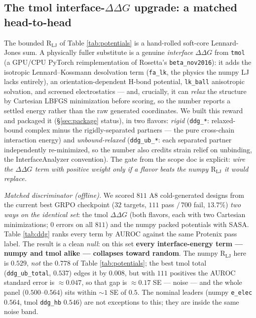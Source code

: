 \documentclass[11pt]{article}
\newcommand{\R}{\mathrm{R}}
\newcommand{\ttk}[1]{\texttt{\small #1}}
\begin{document}
\subsection{The tmol interface-\texorpdfstring{$\Delta\Delta G$}{ddG} upgrade: a matched head-to-head}
\label{sec:ddg}
The bounded $\R_{\mathrm{LJ}}$ of Table \ref{tab:potentials} is a hand-rolled soft-core Lennard-Jones
sum. A physically fuller substitute is a genuine \emph{interface} $\Delta\Delta G$ from
\ttk{tmol} (a GPU/CPU PyTorch reimplementation of Rosetta's \ttk{beta\_nov2016}): it adds the
isotropic Lennard--Kossmann desolvation term (\ttk{fa\_lk}, the physics the numpy LJ lacks entirely),
an orientation-dependent H-bond potential, \ttk{lk\_ball} anisotropic solvation, and screened
electrostatics --- and, crucially, it can \emph{relax} the structure by Cartesian LBFGS minimization
before scoring, so the number reports a settled energy rather than the raw generated coordinates. We
built this reward and packaged it (\S\ref{sec:package} status), in two flavors: \emph{rigid}
(\ttk{ddg\_*}: relaxed-bound complex minus the rigidly-separated partners --- the pure cross-chain
interaction energy) and \emph{unbound-relaxed} (\ttk{ddg\_ub\_*}: each separated partner
independently re-minimized, so the number also credits strain relief on unbinding, the
InterfaceAnalyzer convention). The gate from the scope doc is explicit: \emph{wire the $\Delta\Delta G$
term with positive weight only if a flavor beats the numpy $\R_{\mathrm{LJ}}$ it would replace.}

\emph{Matched discriminator (offline).} We scored $811$ A8 cold-generated designs from the current
best GRPO checkpoint ($32$ targets, $111$ pass $/\,700$ fail, $13.7\%$) \emph{two ways on the
identical set}: the tmol $\Delta\Delta G$ (both flavors, each with two Cartesian minimizations;
$0$ errors on all $811$) and the numpy packed potentials with SASA. Table \ref{tab:ddg} ranks every
term by AUROC against the same Protenix pass label. The result is a clean \emph{null}: on this set
\textbf{every interface-energy term --- numpy and tmol alike --- collapses toward random}. The numpy
$\R_{\mathrm{LJ}}$ here is $0.529$, \emph{not} the $0.778$ of Table \ref{tab:potentials}; the best
tmol total (\ttk{ddg\_ub\_total}, $0.537$) edges it by $0.008$, but with $111$ positives the AUROC
standard error is $\approx\!0.047$, so that gap is $\approx\!0.17$ SE --- noise --- and the whole
panel ($0.500$--$0.564$) sits within $\sim\!1$ SE of $0.5$. The nominal leaders (numpy \ttk{e\_elec}
$0.564$, tmol \ttk{ddg\_hb} $0.546$) are not exceptions to this; they are inside the same noise band.
\end{document}
